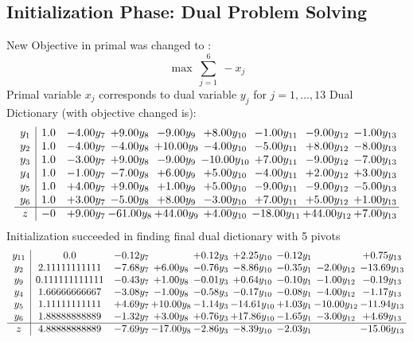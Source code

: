 \documentclass[8pt]{article}
\begin{document}
\subsection{Initialization Phase: Dual Problem Solving}
New Objective in primal was changed to : \[ \max\ \sum_{j=1}^{6}\ - x_j \] 
Primal variable $x_j$ corresponds to dual variable $y_j$ for $j = 1,\ldots,13$
Dual Dictionary (with objective changed is): 
\[\begin{array}{c| c c@{\hskip 2pt} c@{\hskip 2pt} c@{\hskip 2pt} c@{\hskip 2pt} c@{\hskip 2pt} c@{\hskip 2pt} c@{\hskip 2pt} }
 y_{1}   &  1.0 & -4.00 y_{7} & +  9.00 y_{8} & -9.00 y_{9} & +  8.00 y_{10} & -1.00 y_{11} & -9.00 y_{12} & -1.00 y_{13}\\
 y_{2}   &  1.0 & -4.00 y_{7} & -4.00 y_{8} & + 10.00 y_{9} & -4.00 y_{10} & -5.00 y_{11} & +  8.00 y_{12} & -8.00 y_{13}\\
 y_{3}   &  1.0 & -3.00 y_{7} & +  9.00 y_{8} & -9.00 y_{9} & -10.00 y_{10} & +  7.00 y_{11} & -9.00 y_{12} & -7.00 y_{13}\\
 y_{4}   &  1.0 & -1.00 y_{7} & -7.00 y_{8} & +  6.00 y_{9} & +  5.00 y_{10} & -4.00 y_{11} & +  2.00 y_{12} & +  3.00 y_{13}\\
 y_{5}   &  1.0 & +  4.00 y_{7} & +  9.00 y_{8} & +  1.00 y_{9} & +  5.00 y_{10} & -9.00 y_{11} & -9.00 y_{12} & -5.00 y_{13}\\
 y_{6}   &  1.0 & +  3.00 y_{7} & -5.00 y_{8} & +  8.00 y_{9} & -3.00 y_{10} & +  7.00 y_{11} & +  5.00 y_{12} & +  1.00 y_{13}\\
\hline
z    &  -0 & +  9.00 y_{7} & -61.00 y_{8} & + 44.00 y_{9} & +  4.00 y_{10} & -18.00 y_{11} & + 44.00 y_{12} & +  7.00 y_{13}\\
\end{array}\]
Initialization succeeded in finding final dual dictionary with 5 pivots
\[\begin{array}{c| c c@{\hskip 2pt} c@{\hskip 2pt} c@{\hskip 2pt} c@{\hskip 2pt} c@{\hskip 2pt} c@{\hskip 2pt} c@{\hskip 2pt} }
 y_{11}   &  0.0 & -0.12 y_{7} &   & +  0.12 y_{3} & +  2.25 y_{10} & -0.12 y_{1} &   & +  0.75 y_{13}\\
 y_{2}   &  2.11111111111 & -7.68 y_{7} & +  6.00 y_{8} & -0.76 y_{3} & -8.86 y_{10} & -0.35 y_{1} & -2.00 y_{12} & -13.69 y_{13}\\
 y_{9}   &  0.111111111111 & -0.43 y_{7} & +  1.00 y_{8} & -0.01 y_{3} & +  0.64 y_{10} & -0.10 y_{1} & -1.00 y_{12} & -0.19 y_{13}\\
 y_{4}   &  1.66666666667 & -3.08 y_{7} & -1.00 y_{8} & -0.58 y_{3} & -0.17 y_{10} & -0.08 y_{1} & -4.00 y_{12} & -1.17 y_{13}\\
 y_{5}   &  1.11111111111 & +  4.69 y_{7} & + 10.00 y_{8} & -1.14 y_{3} & -14.61 y_{10} & +  1.03 y_{1} & -10.00 y_{12} & -11.94 y_{13}\\
 y_{6}   &  1.88888888889 & -1.32 y_{7} & +  3.00 y_{8} & +  0.76 y_{3} & + 17.86 y_{10} & -1.65 y_{1} & -3.00 y_{12} & +  4.69 y_{13}\\
\hline
z    &  4.88888888889 & -7.69 y_{7} & -17.00 y_{8} & -2.86 y_{3} & -8.39 y_{10} & -2.03 y_{1} &   & -15.06 y_{13}\\
\end{array}\]
\end{document}
